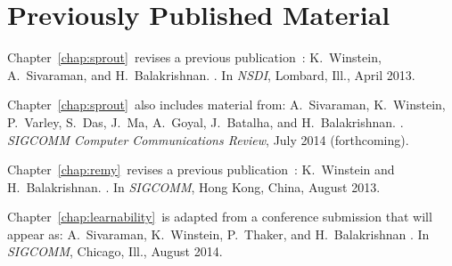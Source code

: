 \chapter*{Previously Published Material}
%

{
\setlength{\parindent}{0 pt}
\setlength{\parskip}{\baselineskip}

Chapter~\ref{chap:sprout}~revises a previous
publication~\cite{sprout}:
K.~Winstein, A.~Sivaraman, and H.~Balakrishnan.
.
\newblock In {\em NSDI}, Lombard, Ill., April 2013.

Chapter~\ref{chap:sprout}~also includes material from: A.~Sivaraman,
K.~Winstein, P.~Varley, S.~Das, J.~Ma, A.~Goyal, J.~Batalha, and
H.~Balakrishnan.  .  \newblock
{\em SIGCOMM Computer Communications Review}, July 2014 (forthcoming).

Chapter~\ref{chap:remy}~revises a previous publication~\cite{remy}:
K.~Winstein and H.~Balakrishnan.
.
\newblock In {\em SIGCOMM}, Hong Kong, China, August 2013.

Chapter~\ref{chap:learnability}~is adapted from a conference
submission that will appear as:
A.~Sivaraman, K.~Winstein, P.~Thaker, and H.~Balakrishnan
. \newblock In {\em
  SIGCOMM}, Chicago, Ill., August 2014.

}
